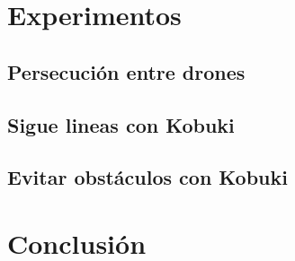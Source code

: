 \documentclass{article}
\begin{document}
\section{Experimentos}
    \subsection{Persecución entre drones}
    \subsection{Sigue lineas con Kobuki}
    \subsection{Evitar obstáculos con Kobuki}
\section{Conclusión}
\end{document}
